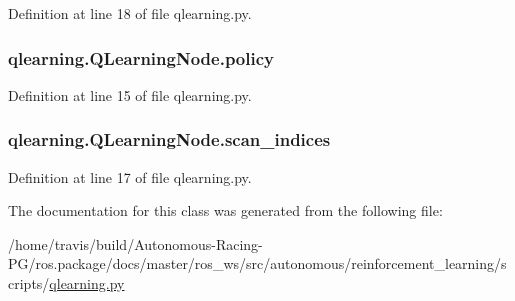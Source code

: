 Definition at line 18 of file qlearning.\+py.

\subsubsection[{\texorpdfstring{policy}{policy}}]{\setlength{\rightskip}{0pt plus 5cm}qlearning.\+Q\+Learning\+Node.\+policy}\hypertarget{classqlearning_1_1_q_learning_node_a2c1150dd506209b085dad03036775375}{}\label{classqlearning_1_1_q_learning_node_a2c1150dd506209b085dad03036775375}


Definition at line 15 of file qlearning.\+py.

\subsubsection[{\texorpdfstring{scan\+\_\+indices}{scan_indices}}]{\setlength{\rightskip}{0pt plus 5cm}qlearning.\+Q\+Learning\+Node.\+scan\+\_\+indices}\hypertarget{classqlearning_1_1_q_learning_node_a40b085aff23685cc49b297f287743ed6}{}\label{classqlearning_1_1_q_learning_node_a40b085aff23685cc49b297f287743ed6}


Definition at line 17 of file qlearning.\+py.



The documentation for this class was generated from the following file\+:\begin{DoxyCompactItemize}
\item 
/home/travis/build/\+Autonomous-\/\+Racing-\/\+P\+G/ros.\+package/docs/master/ros\+\_\+ws/src/autonomous/reinforcement\+\_\+learning/scripts/\hyperlink{qlearning_8py}{qlearning.\+py}\end{DoxyCompactItemize}
